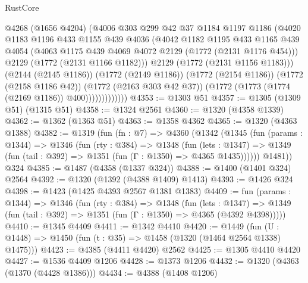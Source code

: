 \begin{lexlean}{RustCore}
\begin{coremodule}
                        @4268
                        (@1656 @4204)
                        (@4006
                          @303
                          @299
                          @42
                          @37
                          @1184
                          @1197
                          @1186
                          (@4020
                            @1183
                            @1196
                            @433
                            @1155
                            @439
                            @4036
                            (@4042
                              @1182
                              @1195
                              @433
                              @1165
                              @439
                              @4054
                              (@4063 @1175 @439 @4069 @4072 @2129 (@1772 (@2131 @1176 @454)))
                              @2129
                              (@1772 (@2131 @1166 @1182)))
                            @2129
                            (@1772 (@2131 @1156 @1183)))
                          (@2144 (@2145 @1186))
                          (@1772 (@2149 @1186))
                          (@1772 (@2154 @1186))
                          (@1772 (@2158 @1186 @42))
                          (@1772 (@2163 @303 @42 @37))
                          (@1772 (@1773 (@1774 (@2169 @1186)) @400)))))))))))))
@4353 := @1303 @51
@4357 := @1305 (@1309 @51) (@1315 @51)
@4358 := @1324 @2561
@4360 := @1320 (@4358 @1339)
@4362 := @1362 (@1363 @51)
@4363 := @1358 @4362
@4365 := @1320 (@4363 @1388)
@4382 := @1319
    (fun (fn : @7) =>
    @4360
      (@1342
        (@1345
          (fun (params : @1344) =>
          @1346
            (fun (rty : @384) =>
            @1348
              (fun (lets : @1347) =>
              @1349 (fun (tail : @392) => @1351 (fun (Γ : @1350) => @4365 @1435))))))
        @1481))
    @324
@4385 := @1487 (@4358 (@1337 @324))
@4388 := @1400 (@1401 @324) @2564
@4392 := @1320 (@1392 (@4388 @1409) @1413)
@4393 := @1426 @324
@4398 := @1423 (@1425 @4393 @2567 @1381 @1383)
@4409 := fun (params : @1344) =>
  @1346
    (fun (rty : @384) =>
    @1348
      (fun (lets : @1347) =>
      @1349 (fun (tail : @392) => @1351 (fun (Γ : @1350) => @4365 (@4392 @4398)))))
@4410 := @1345 @4409
@4411 := @1342 @4410
@4420 := @1449 (fun (U : @1448) => @1450 (fun (t : @35) => @1458 (@1320 (@1464 @2564 @1338) @1475)))
@4423 := @4385 (@4411 @4420) @2562
@4425 := @1305 @4410 @4420
@4427 := @1536 @4409 @1206
@4428 := @1373 @1206
@4432 := @1320 (@4363 (@1370 (@4428 @1386)))
@4434 := @4388 (@1408 @1206)

\end{coremodule}
\end{lexlean}
